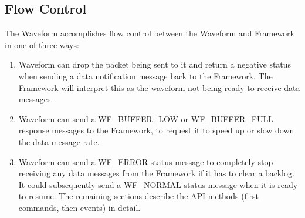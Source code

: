 \subsection {Flow Control}
The Waveform accomplishes flow control between the Waveform and Framework in one of three ways:

\begin{enumerate}
	\item	Waveform can drop the packet being sent to it and return a negative status when sending a data notification message back to the Framework.  The Framework will interpret this as the waveform not being ready to receive data messages.
	\item	Waveform can send a WF\_BUFFER\_LOW or WF\_BUFFER\_FULL response messages to the Framework, to request it to speed up or slow down the data message rate.
	\item	Waveform can send a WF\_ERROR status message to completely stop receiving any data messages from the Framework if it has to clear a backlog.  It could subsequently send a WF\_NORMAL status message when it is ready to resume.
	The remaining sections describe the API methods (first commands, then events) in detail.
\end{enumerate}

